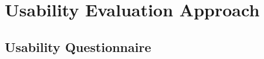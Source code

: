 \section{Usability Evaluation Approach}
\label{sec:evaluation-approach}

\subsection{Usability Questionnaire}